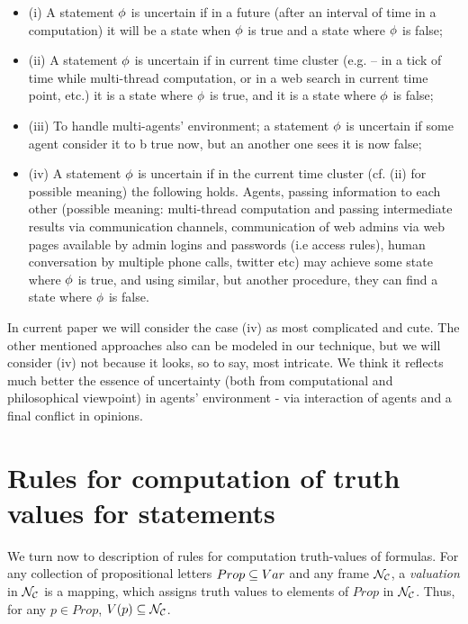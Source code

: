 \documentclass[runningheads]{llncs}
\begin{document}
\begin{itemize}
\item{(i)}
A statement $\phi$ is uncertain if in  a future (after an interval of time in a computation) it will be a state when $\phi$ is true and a state where $\phi$ is false;

\vspace*{0.3cm}
\item{(ii)}
A statement $\phi$ is uncertain if in current time cluster (e.g. -- in a tick of time while multi-thread computation, or in a web search in current time point, etc.) it is a state where $\phi$ is true, and  it is  a state where $\phi$ is false;

\vspace*{0.3cm}
\item{(iii)} To handle multi-agents' environment;
 a statement $\phi$ is uncertain if some agent consider it to b true now, but an another one sees it is now false;


\vspace*{0.3cm}
\item{(iv)}
A statement $\phi$ is uncertain if in the current time cluster (cf. (ii) for possible meaning) the following holds. Agents, passing information to each other (possible meaning: multi-thread computation and passing intermediate results via communication channels, communication of web admins via web pages available by admin logins and passwords (i.e access rules), human conversation by multiple phone calls, twitter etc) may achieve some state where $\phi$ is true, and using similar, but another
procedure, they can find a state where $\phi$ is false.
\end{itemize}


In current paper we will consider the case (iv) as most complicated and cute.
The other mentioned approaches also can be modeled in our technique, but we will consider (iv) not because it looks, so to say, most intricate. We think it reflects
 much better the essence of uncertainty (both from computational and philosophical
viewpoint) in agents' environment - via interaction of agents and a final conflict in opinions.




\section{Rules for computation of truth values for statements}

We turn now to description of rules
 for computation truth-values of formulas. For
any collection of propositional letters $Prop\subseteq\mathop{Var}$ and any
frame $\mathcal{N_C}$, a \emph{valuation} in  $\mathcal{N_C}$ is a mapping, which
 assigns truth values to elements of $Prop$ in
$\mathcal{N_C}$.   Thus, for any
 $p\in Prop$, $V(p)\subseteq \mathcal{N_C}$.
\end{document}
